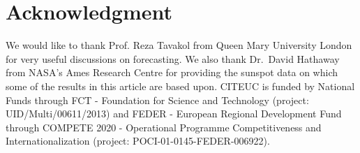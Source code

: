 \documentclass[journal]{IEEEtran}
\begin{document}



\section*{Acknowledgment}
We would like to thank Prof. Reza Tavakol from Queen Mary University London for very useful discussions on forecasting. We also thank
Dr.\ David Hathaway from NASA's Ames Research Centre for providing the sunspot data on which some of the results in this article are based upon.
CITEUC is funded by National Funds through FCT - Foundation for Science
and Technology (project: UID/Multi/00611/2013) and FEDER - European
Regional Development Fund through
COMPETE 2020 - Operational Programme Competitiveness and
Internationalization (project: POCI-01-0145-FEDER-006922).

\ifCLASSOPTIONcaptionsoff
  \newpage
\fi


\end{document}
